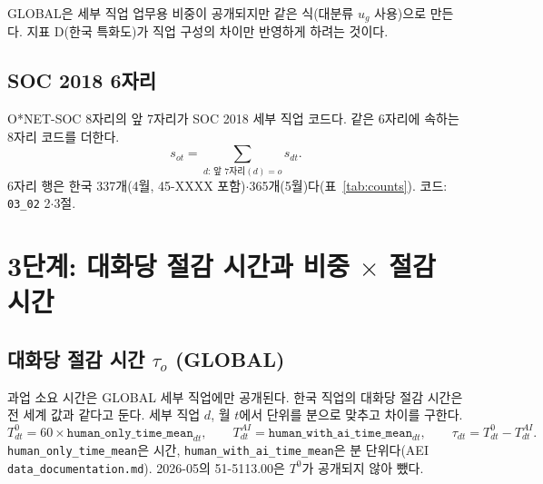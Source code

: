 \documentclass[11pt]{article}
\begin{document}
GLOBAL은 세부 직업 업무용 비중이 공개되지만 같은 식(대분류 $u_g$ 사용)으로 만든다. 지표 D(한국 특화도)가 직업 구성의 차이만 반영하게 하려는 것이다.

\subsection{SOC 2018 6자리}

O*NET-SOC 8자리의 앞 7자리가 SOC 2018 세부 직업 코드다. 같은 6자리에 속하는 8자리 코드를 더한다.
\begin{equation}
s_{ot} = \sum_{d:\, \text{앞 7자리}(d) = o} s_{dt}.
\label{eq:so}
\end{equation}
6자리 행은 한국 337개(4월, 45-XXXX 포함)$\cdot$365개(5월)다(표~\ref{tab:counts}). 코드: \texttt{03\_02} 2$\cdot$3절.

\section{3단계: 대화당 절감 시간과 비중 $\times$ 절감 시간}

\subsection{대화당 절감 시간 $\tau_o$ (GLOBAL)}

과업 소요 시간은 GLOBAL 세부 직업에만 공개된다. 한국 직업의 대화당 절감 시간은 전 세계 값과 같다고 둔다. 세부 직업 $d$, 월 $t$에서 단위를 분으로 맞추고 차이를 구한다.
\begin{equation}
T^{0}_{dt} = 60 \times \texttt{human\_only\_time\_mean}_{dt}, \qquad
T^{AI}_{dt} = \texttt{human\_with\_ai\_time\_mean}_{dt}, \qquad
\tau_{dt} = T^{0}_{dt} - T^{AI}_{dt}.
\label{eq:taud}
\end{equation}
\texttt{human\_only\_time\_mean}은 시간, \texttt{human\_with\_ai\_time\_mean}은 분 단위다(AEI \texttt{data\_documentation.md}). 2026-05의 51-5113.00은 $T^{0}$가 공개되지 않아 뺐다.
\end{document}
